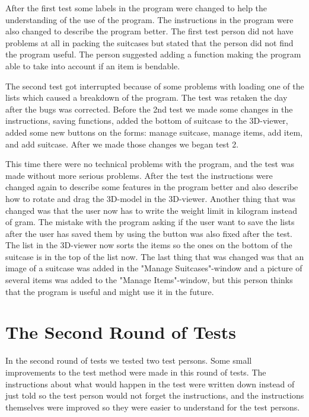 After the first test some labels in the program were changed to help the understanding of the use of the program. The instructions in the program were also changed to describe the program better. The first test person did not have problems at all in packing the suitcases but stated that the person did not find the program useful. The person suggested adding a function making the program able to take into account if an item is bendable.

The second test got interrupted because of some problems with loading one of the lists which caused a breakdown of the program. The test was retaken the day after the bugs was corrected. Before the 2nd test we made some changes in the instructions, saving functions, added the bottom of suitcase to the 3D-viewer, added some new buttons on the forms: manage suitcase, manage items, add item, and add suitcase. After we made those changes we began test 2.

This time there were no technical problems with the program, and the test was made without more serious problems. After the test the instructions were changed again to describe some features in the program better and also describe how to rotate and drag the 3D-model in the 3D-viewer. Another thing that was changed was that the user now has to write the weight limit in kilogram instead of gram. The mistake with the program asking if the user want to save the lists after the user has saved them by using the button was also fixed after the test. The list in the 3D-viewer now sorts the items so the ones on the bottom of the suitcase is in the top of the list now. The last thing that was changed was that an image of a suitcase was added in the "Manage Suitcases"-window and a picture of several items was added to the "Manage Items"-window, but this person thinks that the program is useful and might use it in the future.

\section{The Second Round of Tests}
In the second round of tests we tested two test persons. Some small improvements to the test method were made in this round of tests. The instructions about what would happen in the test were written down instead of just told so the test person would not forget the instructions, and the instructions themselves were improved so they were easier to understand for the test persons.

